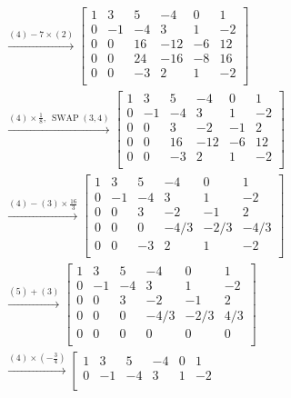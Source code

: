 \begin{problem}
\begin{solution}
\begin{enumerate}
$$\begin{aligned}
				& \xrightarrow{(4)-7 \times (2)} \left[\begin{array}{ccccc|c}
					1 & 3 & 5 & -4 & 0 & 1 \\
					0 & -1 & -4 & 3 & 1 & -2 \\
					0 & 0 & 16 & -12 & -6 & 12 \\
					0 & 0 & 24 & -16 & -8 & 16 \\
					0 & 0 & -3 & 2 & 1 & -2 \\
				\end{array}\right] \\
				& \xrightarrow{(4) \times \frac{1}{8},\ \operatorname{SWAP}(3,4)} \left[\begin{array}{ccccc|c}
					1 & 3 & 5 & -4 & 0 & 1 \\
					0 & -1 & -4 & 3 & 1 & -2 \\
					0 & 0 & 3 & -2 & -1 & 2 \\
					0 & 0 & 16 & -12 & -6 & 12 \\
					0 & 0 & -3 & 2 & 1 & -2 \\
				\end{array}\right] \\
				& \xrightarrow{(4) - (3) \times \frac{16}{3}} \left[\begin{array}{ccccc|c}
					1 & 3 & 5 & -4 & 0 & 1 \\
					0 & -1 & -4 & 3 & 1 & -2 \\
					0 & 0 & 3 & -2 & -1 & 2 \\
					0 & 0 & 0 & -4/3 & -2/3 & -4/3 \\
					0 & 0 & -3 & 2 & 1 & -2 \\
				\end{array}\right] \\
				& \xrightarrow{(5) + (3)} \left[\begin{array}{ccccc|c}
					1 & 3 & 5 & -4 & 0 & 1 \\
					0 & -1 & -4 & 3 & 1 & -2 \\
					0 & 0 & 3 & -2 & -1 & 2 \\
					0 & 0 & 0 & -4/3 & -2/3 & 4/3 \\
					0 & 0 & 0 & 0 & 0 & 0 \\
				\end{array}\right] \\
				& \xrightarrow{(4) \times (-\frac{3}{4})} \left[\begin{array}{ccccc|c}
					1 & 3 & 5 & -4 & 0 & 1 \\
					0 & -1 & -4 & 3 & 1 & -2 \\

\end{array}
\end{aligned}$$
\end{enumerate}
\end{solution}
\end{problem}
